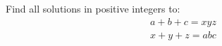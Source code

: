 Find all solutions in positive integers to:
\begin{eqnarray*} a + b + c = xyz \\ x + y + z = abc \end{eqnarray*}